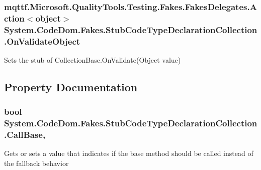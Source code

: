 \hypertarget{class_system_1_1_code_dom_1_1_fakes_1_1_stub_code_type_declaration_collection_ae386885842d1bb8169906bb1b3a44ace}{
\subsubsection[{On\-Validate\-Object}]{\setlength{\rightskip}{0pt plus 5cm}mqttf.\-Microsoft.\-Quality\-Tools.\-Testing.\-Fakes.\-Fakes\-Delegates.\-Action$<$object$>$ System.\-Code\-Dom.\-Fakes.\-Stub\-Code\-Type\-Declaration\-Collection.\-On\-Validate\-Object}}\label{class_system_1_1_code_dom_1_1_fakes_1_1_stub_code_type_declaration_collection_ae386885842d1bb8169906bb1b3a44ace}


Sets the stub of Collection\-Base.\-On\-Validate(\-Object value)



\subsection{Property Documentation}
\hypertarget{class_system_1_1_code_dom_1_1_fakes_1_1_stub_code_type_declaration_collection_a3ebc5b8b64c00c2f1dbede45cafec3d6}{
\subsubsection[{Call\-Base}]{\setlength{\rightskip}{0pt plus 5cm}bool System.\-Code\-Dom.\-Fakes.\-Stub\-Code\-Type\-Declaration\-Collection.\-Call\-Base\hspace{0.3cm}{\ttfamily [get]}, {\ttfamily [set]}}}\label{class_system_1_1_code_dom_1_1_fakes_1_1_stub_code_type_declaration_collection_a3ebc5b8b64c00c2f1dbede45cafec3d6}


Gets or sets a value that indicates if the base method should be called instead of the fallback behavior

